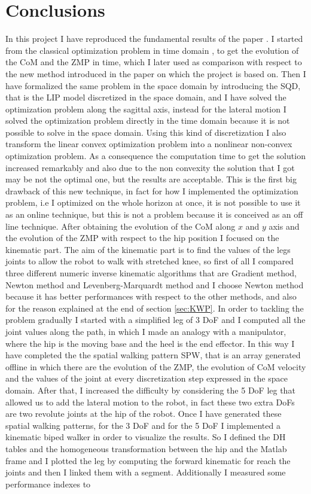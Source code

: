 \documentclass[a4paper]{article}
\begin{document}
\newpage

\section{Conclusions}

In this project I have reproduced the fundamental results of the paper \cite{Kaj1}. I started from the classical optimization problem in time domain , to get the evolution of the CoM and the ZMP in time, which I later used as comparison with respect to the new method introduced in the paper on which the project is based on. Then I have formalized the same problem in the space domain by introducing the SQD, that is the LIP model discretized in the space domain, and I have solved the optimization problem along the sagittal axis, instead for the lateral motion I solved the optimization problem directly in the time domain because it is not possible to solve in the space domain. Using this kind of discretization I also transform the linear convex optimization problem into a nonlinear non-convex optimization problem. As a consequence the computation time to get the solution increased remarkably and also due to the non convexity the solution that I got may be not the optimal one, but the results are acceptable. This is the first big drawback of this new technique, in fact for how I implemented the optimization problem, i.e I  optimized on the whole horizon at once, it is not possible to use it as an online technique, but this is not a problem because it is conceived as an off line technique. After obtaining the evolution of the CoM along $x$ and $y$ axis and the evolution of the ZMP with respect to the hip position I focused on the kinematic part. The aim of the kinematic part is to find the values of the legs joints to allow the robot to walk with stretched knee, so first of all I compared three different numeric inverse kinematic algorithms that are Gradient method, Newton method and Levenberg-Marquardt method and I choose Newton method because it has better performances with respect to the other methods, and also for the reason explained at the end of section \ref{sec:KWP}. In order to tackling the problem gradually I started with a simplified leg of 3 DoF and I computed all the joint values along the path, in which I made an analogy with a manipulator, where the hip is the moving base and the heel is the end effector. In this way I have completed the the spatial walking pattern SPW, that is an array generated offline in which there are the evolution of the ZMP, the evolution of CoM velocity and the values of the joint at every discretization step expressed in the space domain. After that, I  increased the difficulty by considering the 5 DoF leg that allowed us to add the lateral motion to the robot, in fact these two extra DoFs  are two revolute joints at the hip of the robot. Once I have generated these spatial walking patterns, for the 3 DoF and for the 5 DoF I implemented a kinematic biped walker in order to visualize the results. So I defined the DH tables and the homogeneous transformation between the hip and the Matlab frame and I plotted the leg by computing the forward kinematic for reach the joints and then I linked them with a segment. Additionally I measured some performance indexes to 
\end{document}
